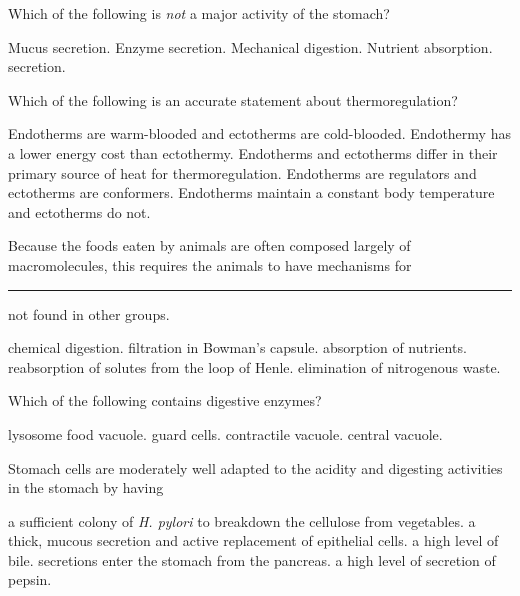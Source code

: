 \question
Which of the following is \emph{not} a major activity of the stomach?

\begin{choices}
\choice Mucus secretion. 
\choice Enzyme secretion. 
\choice Mechanical digestion. 
\correctchoice Nutrient absorption. 
\choice {} secretion. 
\end{choices}

\question
Which of the following is an accurate statement about thermoregulation?

\begin{choices}
\choice Endotherms are warm-blooded and ectotherms are cold-blooded.  
\choice Endothermy has a lower energy cost than ectothermy. 
\correctchoice Endotherms and ectotherms differ in their primary source of heat for thermoregulation. 
\choice Endotherms are regulators and ectotherms are conformers. 
\choice Endotherms maintain a constant body temperature and ectotherms do not. 
\end{choices}

\question
Because the foods eaten by animals are often composed largely of macromolecules, this requires the animals to have mechanisms for \rule{1in}{0.4pt} not found in other groups.

\begin{choices}
\correctchoice chemical digestion. 
\choice filtration in Bowman's capsule. 
\choice absorption of nutrients. 
\choice reabsorption of solutes from the loop of Henle. 
\choice elimination of nitrogenous waste. 
\end{choices}

\question
Which of the following contains digestive enzymes?

\begin{choices}
\correctchoice lysosome 
\choice food vacuole. 
\choice guard cells. 
\choice contractile vacuole. 
\choice central vacuole. 
\end{choices}

\question
Stomach cells are moderately well adapted to the acidity and digesting activities in the stomach by having

\begin{choices}
\choice a sufficient colony of \textit{H. pylori} to breakdown the cellulose from vegetables. 
\correctchoice a thick, mucous secretion and active replacement of epithelial cells. 
\choice a high level of bile. 
\choice secretions enter the stomach from the pancreas. 
\choice a high level of secretion of pepsin. 
\end{choices}

